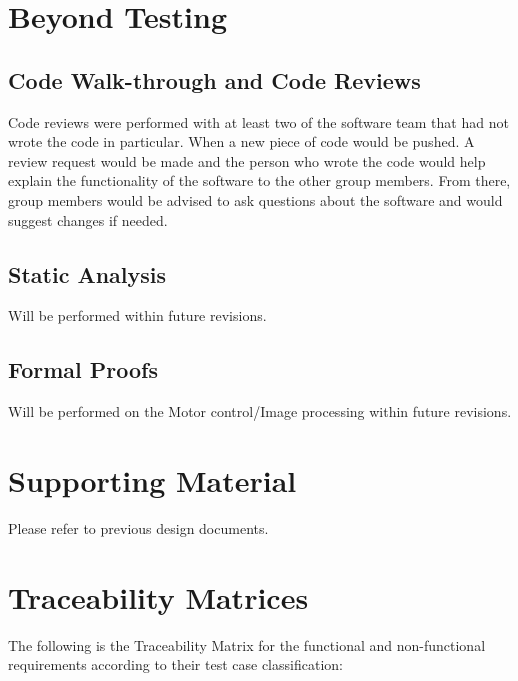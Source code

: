 \documentclass [10pt]{article}
\begin{document}
\pagebreak

\section {Beyond Testing}

\subsection {Code Walk-through and Code Reviews}
Code reviews were performed with at least two of the software team that had not wrote the code in particular. When a new piece of code would be pushed. A review request would be made and the person who wrote the code would help explain the functionality of the software to the other group members. From there, group members would be advised to ask questions about the software and would suggest changes if needed.

\subsection {Static Analysis}
Will be performed within future revisions.

\subsection {Formal Proofs}
Will be performed on the Motor control/Image processing within future revisions.

\section {Supporting Material}

Please refer to previous design documents.

\section {Traceability Matrices}
The following is the Traceability Matrix for the functional and non-functional requirements according to their test case classification: \\
\end{document}
